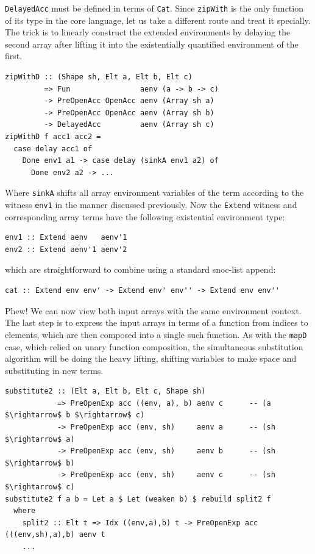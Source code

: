 \texttt{DelayedAcc} must be defined in terms of \texttt{Cat}. Since
\texttt{zipWith} is the only function of its type in the core language, let us
take a different route and treat it specially. The trick is to linearly
construct the extended environments by delaying the second array after lifting
it into the existentially quantified environment of the first.
%
\begin{lstlisting}[style=haskell]
zipWithD :: (Shape sh, Elt a, Elt b, Elt c)
         => Fun                aenv (a -> b -> c)
         -> PreOpenAcc OpenAcc aenv (Array sh a)
         -> PreOpenAcc OpenAcc aenv (Array sh b)
         -> DelayedAcc         aenv (Array sh c)
zipWithD f acc1 acc2 =
  case delay acc1 of
    Done env1 a1 -> case delay (sinkA env1 a2) of
      Done env2 a2 -> ...
\end{lstlisting}
%
Where \texttt{sinkA} shifts all array environment variables of the term
according to the witness \texttt{env1} in the manner discussed previously. Now
the \texttt{Extend} witness and corresponding array terms have the following
existential environment type:
%
\begin{lstlisting}[style=haskell]
env1 :: Extend aenv   aenv'1
env2 :: Extend aenv'1 aenv'2
\end{lstlisting}
%
which are straightforward to combine using a standard snoc-list append:
%
\begin{lstlisting}[style=haskell]
cat :: Extend env env' -> Extend env' env'' -> Extend env env''
\end{lstlisting}
%
Phew! We can now view both input arrays with the same environment context. The
last step is to express the input arrays in terms of a function from indices to
elements, which are then composed into a single such function. As with the
\texttt{mapD} case, which relied on unary function composition, the simultaneous
substitution algorithm will be doing the heavy lifting, shifting variables to
make space and substituting in new terms.
%
\begin{lstlisting}[style=haskell]
substitute2 :: (Elt a, Elt b, Elt c, Shape sh)
            => PreOpenExp acc ((env, a), b) aenv c      -- (a $\rightarrow$ b $\rightarrow$ c)
            -> PreOpenExp acc (env, sh)     aenv a      -- (sh $\rightarrow$ a)
            -> PreOpenExp acc (env, sh)     aenv b      -- (sh $\rightarrow$ b)
            -> PreOpenExp acc (env, sh)     aenv c      -- (sh $\rightarrow$ c)
substitute2 f a b = Let a $ Let (weaken b) $ rebuild split2 f
  where
    split2 :: Elt t => Idx ((env,a),b) t -> PreOpenExp acc (((env,sh),a),b) aenv t
    ...
\end{lstlisting}

